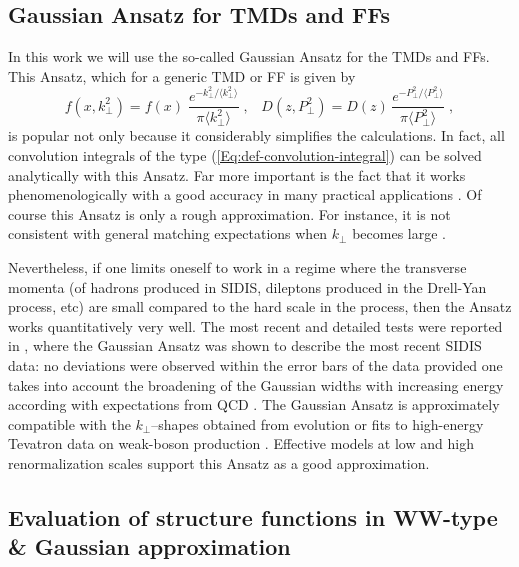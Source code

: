 \documentclass[a4paper,11pt]{article}
\newcommand{\be}{\begin{equation}}
\newcommand{\ee}{\end{equation}}
\newcommand{\la}{\langle}
\newcommand{\ra}{\rangle}
\def\kperp{k_\perp}
\def\pperp{P_\perp}
\def\avkperp{\la \kperp^2 \ra}
\def\avpperp{\la \pperp^2 \ra}
\begin{document}
\subsection{Gaussian Ansatz for TMDs and FFs}
\label{Sec-4.3:evaluation}

In this work we will use the so-called Gaussian Ansatz for the TMDs and FFs.
This Ansatz, which for a generic TMD or FF is given by
\be\label{Eq:Gauss-generic}
    f(x,\kperp^2) = f(x)\;
    \frac{e^{-\kperp^2/\avkperp}}{\pi\avkperp} \;,\;\;\;
    D(z,\pperp^2) = D(z)\,
    \frac{e^{-\pperp^2/\avpperp}}{\pi\avpperp}\;,
\ee
is popular not only because it considerably simplifies the
calculations. In fact, all convolution integrals of the type 
(\ref{Eq:def-convolution-integral}) can be solved analytically 
with this Ansatz. Far more important is the fact that it works 
phenomenologically with a good accuracy in many practical applications
\cite{Anselmino:2005nn,Collins:2005ie,D'Alesio:2007jt,Schweitzer:2010tt,
Signori:2013mda,Anselmino:2013lza}.
Of course this Ansatz is only a rough approximation. For instance, 
it is not consistent with general matching expectations when $\kperp$ 
becomes large \cite{Bacchetta:2008xw}. 

Nevertheless, if one limits oneself to work in a regime where the 
transverse momenta (of hadrons produced in SIDIS, dileptons produced
in the Drell-Yan process, etc) are small compared to the hard
scale in the process, then the Ansatz works quantitatively
very well. The most recent and detailed tests were reported in 
\cite{Schweitzer:2010tt}, where the Gaussian Ansatz was shown to
describe the most recent SIDIS data: no deviations were observed 
within the error bars of the data provided one takes into account 
the broadening of the Gaussian widths with increasing energy 
\cite{Schweitzer:2010tt} according
with expectations from QCD \cite{Aybat:2011zv}.
The Gaussian Ansatz is approximately compatible with 
the $\kperp$--shapes obtained from evolution \cite{Aybat:2011zv}
or fits to high-energy Tevatron data on weak-boson production
\cite{Landry:2002ix}. Effective models at 
low \cite{Pasquini:2008ax,Avakian:2010br,Lorce:2011dv} and 
high \cite{Efremov:2009ze} renormalization scales support this
Ansatz as a good approximation.

\subsection{Evaluation of structure functions in WW-type \&
 Gaussian approximation}
\label{Sec-4.4:evaluation}
\end{document}
